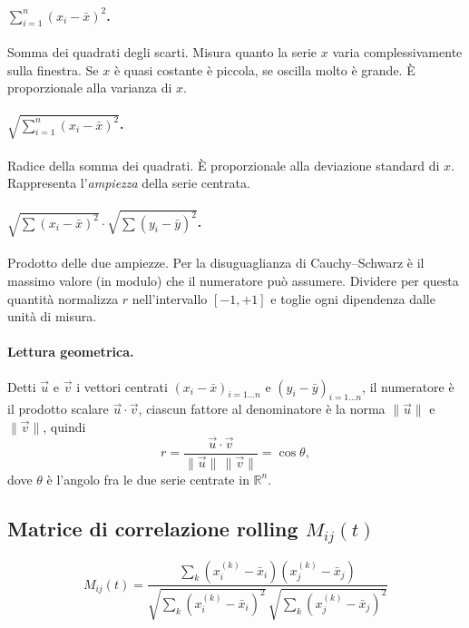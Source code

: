\documentclass[a4paper,11pt]{article}
\begin{document}
\paragraph{$\sum_{i=1}^{n} (x_i - \bar x)^2$.} Somma dei quadrati degli
scarti. Misura quanto la serie $x$ varia complessivamente sulla finestra.
Se $x$ è quasi costante è piccola, se oscilla molto è grande. È
proporzionale alla varianza di $x$.

\paragraph{$\sqrt{\sum_{i=1}^{n} (x_i - \bar x)^2}$.} Radice della somma
dei quadrati. È proporzionale alla deviazione standard di $x$.
Rappresenta l'\emph{ampiezza} della serie centrata.

\paragraph{$\sqrt{\sum(x_i-\bar x)^2}\cdot\sqrt{\sum(y_i-\bar y)^2}$.}
Prodotto delle due ampiezze. Per la disuguaglianza di Cauchy--Schwarz è
il massimo valore (in modulo) che il numeratore può assumere. Dividere
per questa quantità normalizza $r$ nell'intervallo $[-1, +1]$ e toglie
ogni dipendenza dalle unità di misura.

\paragraph{Lettura geometrica.} Detti $\vec u$ e $\vec v$ i vettori
centrati $(x_i - \bar x)_{i=1\dots n}$ e $(y_i - \bar y)_{i=1\dots n}$,
il numeratore è il prodotto scalare $\vec u \cdot \vec v$, ciascun
fattore al denominatore è la norma $\lVert\vec u\rVert$ e
$\lVert\vec v\rVert$, quindi
\[
r = \frac{\vec u \cdot \vec v}{\lVert\vec u\rVert\,\lVert\vec v\rVert}
  = \cos\theta,
\]
dove $\theta$ è l'angolo fra le due serie centrate in $\mathbb{R}^n$.

\subsection{Matrice di correlazione rolling $M_{ij}(t)$}

\[
M_{ij}(t) = \frac{\sum_{k} (x_i^{(k)} - \bar x_i)(x_j^{(k)} - \bar x_j)}
                 {\sqrt{\sum_{k} (x_i^{(k)} - \bar x_i)^2}\,
                  \sqrt{\sum_{k} (x_j^{(k)} - \bar x_j)^2}}
\]
\end{document}
